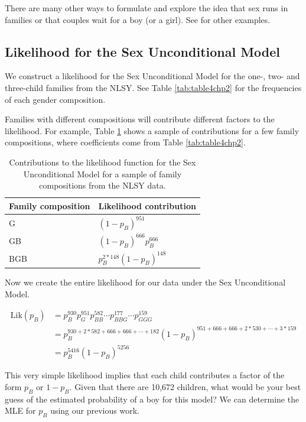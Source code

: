 \documentclass[
]{krantz}
\newcommand{\Lik}{\mathrm{Lik}}
\begin{document}
There are many other ways to formulate and explore the idea that sex runs in families or that couples wait for a boy (or a girl). See \citet{Rodgers2001} for other examples.

\hypertarget{likelihood-for-the-sex-unconditional-model}{%
\subsection{Likelihood for the Sex Unconditional Model}\label{likelihood-for-the-sex-unconditional-model}}

We construct a likelihood for the Sex Unconditional Model for the one-, two- and three-child families from the NLSY. See Table \ref{tab:table4chp2} for the frequencies of each gender composition.

Families with different compositions will contribute different factors to the likelihood. For example, Table \ref{tab:sexuncondmodel} shows a sample of contributions for a few family compositions, where coefficients come from Table \ref{tab:table4chp2}.

\begin{table}

\caption{\label{tab:sexuncondmodel}Contributions to the likelihood function for the Sex Unconditional Model for a sample of family compositions from the NLSY data.}
\centering
\begin{tabular}[t]{>{\raggedright\arraybackslash}p{5cm}>{\raggedright\arraybackslash}p{5cm}}
\toprule
Family composition & Likelihood contribution\\
\midrule
G & $(1-p_B)^{951}$\\
GB & $(1-p_B)^{666}p_B^{666}$\\
BGB & $p_B^{2*148}(1-p_B)^{148}$\\
\bottomrule
\end{tabular}
\end{table}

Now we create the entire likelihood for our data under the Sex Unconditional Model.

\begin{align*}
 \Lik(p_B) &= p_B^{930}p_G^{951}p_{BB}^{582} \cdots p_{BBG}^{177} \cdots p_{GGG}^{159} \\
 &= p_B^{930+2*582+666+666+\cdots+182}(1-p_B)^{951+666+666+2*530+\cdots+3*159} \\
 &=  p_B^{5416}(1-p_B)^{5256}
\end{align*}

This very simple likelihood implies that each child contributes a factor of the form \(p_B\) or \(1-p_B\). Given that there are 10,672 children, what would be your best guess of the estimated probability of a boy for this model? We can determine the MLE for \(p_B\) using our previous work.
\end{document}
